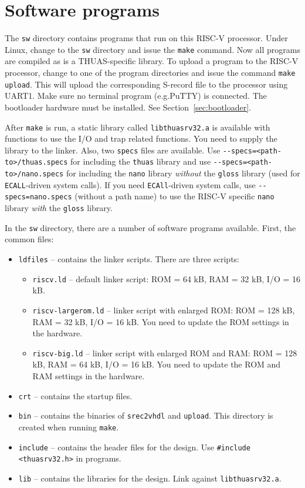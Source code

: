 \documentclass[12pt]{article}
\begin{document}
\section{Software programs}
The \lstinline|sw| directory contains programs that run on this RISC-V processor. Under Linux, change to the \lstinline|sw| directory and issue the \lstinline|make| command. Now all programs are compiled as is a THUAS-specific library. To upload a program to the RISC-V processor, change to one of the program directories and issue the command \lstinline|make upload|. This will upload the corresponding S-record file to the processor using UART1. Make sure no terminal program (e.g.\@ PuTTY) is connected. The bootloader hardware must be installed. See Section~\ref{sec:bootloader}.

After \lstinline|make| is run, a static library called \lstinline|libthuasrv32.a| is available with functions to use the I/O and trap related functions. You need to supply the library to the linker. Also, two \lstinline|specs| files are available. Use \lstinline|--specs=<path-to>/thuas.specs| for including the \lstinline|thuas| library and use \lstinline|--specs=<path-to>/nano.specs| for including the \lstinline|nano| library \textsl{without} the \lstinline|gloss| library (used for \lstinline|ECALL|-driven system calls). If you need \lstinline|ECAll|-driven system calls, use \lstinline|--specs=nano.specs| (without a path name) to use the RISC-V specific \lstinline|nano| library \textsl{with} the \lstinline|gloss| library.

In the \lstinline|sw| directory, there are a number of software programs available. First, the common files:

\begin{itemize}
\item \lstinline|ldfiles| -- contains the linker scripts. There are three scripts:
\begin{itemize}
\item \lstinline|riscv.ld| -- default linker script: ROM = 64 kB, RAM = 32 kB, I/O = 16 kB.
\item \lstinline|riscv-largerom.ld| -- linker script with enlarged ROM: ROM = 128 kB, RAM = 32 kB, I/O = 16 kB. You need to update the ROM settings in the hardware.
\item \lstinline|riscv-big.ld| -- linker script with enlarged ROM and RAM: ROM = 128 kB, RAM = 64 kB, I/O = 16 kB. You need to update the ROM and RAM settings in the hardware.
\end{itemize}
\item \lstinline|crt| -- contains the startup files.
\item \lstinline|bin| -- contains the binaries of \lstinline|srec2vhdl| and \lstinline|upload|. This directory is created when running \lstinline|make|.
\item \lstinline|include| -- contains the header files for the design. Use \lstinline|#include <thuasrv32.h>| in programs.
\item \lstinline|lib| -- contains the libraries for the design. Link against \lstinline|libthuasrv32.a|.
\end{itemize}
\end{document}
